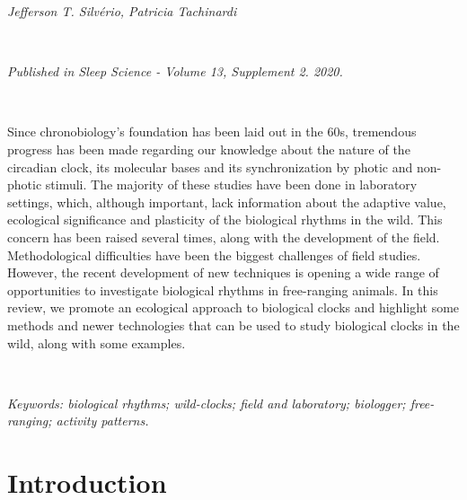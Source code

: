 \documentclass[msc,numbers,hidelinks]{coppe}
\begin{document}
  \emph{Jefferson T. Silvério, Patricia Tachinardi}

  ~

  \emph{Published in Sleep Science - Volume 13, Supplement 2. 2020.}

  ~

  Since chronobiology's foundation has been laid out in the 60s, tremendous progress has been made regarding our knowledge about the nature of the circadian clock, its molecular bases and its synchronization by photic and non-photic stimuli. The majority of these studies have been done in laboratory settings, which, although important, lack information about the adaptive value, ecological significance and plasticity of the biological rhythms in the wild. This concern has been raised several times, along with the development of the field. Methodological difficulties have been the biggest challenges of field studies. However, the recent development of new techniques is opening a wide range of opportunities to investigate biological rhythms in free-ranging animals. In this review, we promote an ecological approach to biological clocks and highlight some methods and newer technologies that can be used to study biological clocks in the wild, along with some examples.

  ~

  \emph{\emph{Keywords:} biological rhythms; wild-clocks; field and laboratory; biologger; free-ranging; activity patterns.}

  \hypertarget{introduction}{%
  \section{Introduction}\label{introduction}}
\end{document}
